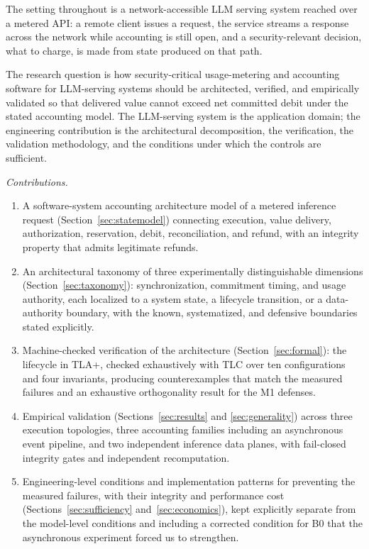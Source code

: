 \documentclass[preprint,3p,authoryear,12pt]{elsarticle}
\begin{document}
The setting throughout is a network-accessible LLM serving system reached over a
metered API: a remote client issues a request, the service streams a response across
the network while accounting is still open, and a security-relevant decision, what
to charge, is made from state produced on that path.

The research question is how security-critical usage-metering and accounting software for
LLM-serving systems should be architected, verified, and empirically validated so that
delivered value cannot exceed net committed debit under the stated accounting model. The
LLM-serving system is the application domain; the engineering contribution is the
architectural decomposition, the verification, the validation methodology, and the
conditions under which the controls are sufficient.

\textit{Contributions.}
\begin{enumerate}
\item A software-system accounting architecture model of a metered inference request
(Section~\ref{sec:statemodel}) connecting execution, value delivery, authorization,
reservation, debit, reconciliation, and refund, with an integrity property that admits
legitimate refunds.
\item An architectural taxonomy of three experimentally distinguishable dimensions
(Section~\ref{sec:taxonomy}): synchronization, commitment timing, and usage authority,
each localized to a system state, a lifecycle transition, or a data-authority boundary,
with the known, systematized, and defensive boundaries stated explicitly.
\item Machine-checked verification of the architecture (Section~\ref{sec:formal}): the
lifecycle in TLA+, checked exhaustively with TLC over ten configurations and four
invariants, producing counterexamples that match the measured failures and an exhaustive
orthogonality result for the M1 defenses.
\item Empirical validation (Sections~\ref{sec:results} and \ref{sec:generality}) across
three execution topologies, three accounting families including an asynchronous event
pipeline, and two independent inference data planes, with fail-closed integrity gates and
independent recomputation.
\item Engineering-level conditions and implementation patterns for preventing the
measured failures, with their integrity and performance cost
(Sections~\ref{sec:sufficiency} and~\ref{sec:economics}), kept explicitly separate from
the model-level conditions and including a corrected condition for B0 that the
asynchronous experiment forced us to strengthen.
\end{enumerate}
\end{document}
